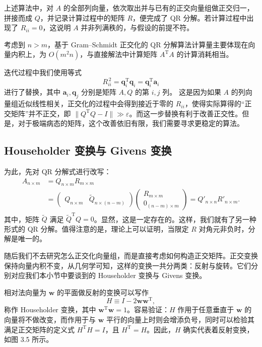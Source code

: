 上述算法中，对 $A$ 的全部列向量，依次取出并与已有的正交向量组做正交归一，拼接而成 $Q$，并记录计算过程中的矩阵 $R$，便完成了 QR 分解。若计算过程中出现了 $R_{ii}=0$，这说明 $A$ 并非列满秩的，与假设的前提不符。

考虑到 $n>m$，基于 Gram--Schmidt 正交化的 QR 分解算法计算量主要体现在向量内积上，为 $O(m^2n)$，与直接解法中计算矩阵 $A^{\mathrm T}A$ 的计算消耗相当。

迭代过程中我们使用等式
\[
R_{ii}^{\,2}=\bm q_i^{\mathrm T}\bm q_i=\bm q_i^{\mathrm T}\bm a_i
\]
进行了替换，其中 $\bm a_i,\bm q_j$ 分别是矩阵 $A,Q$ 的第 $i,j$ 列。
这是因为如果 $A$ 的列向量组近似线性相关，正交化的过程中会得到接近于零的 $R_{ii}$，使得实际算得的“正交矩阵”并不正交，即 $\lVert Q^{\mathrm T}Q-I\rVert\gg\varepsilon$。而这一步替换有利于改善正交性。但是，对于极端病态的矩阵，这个改善依旧有限，我们需要寻求更稳定的算法。

\subsection{Householder 变换与 Givens 变换}

为此，先对 QR 分解式进行改写：
\begin{equation}
\begin{aligned}
A_{n\times m}
&=Q_{n\times m}R_{m\times m}\\
&=\begin{pmatrix}Q_{n\times m}&\widetilde Q_{n\times(n-m)}\end{pmatrix}
\begin{pmatrix}R_{m\times m}\\0_{(n-m)\times m}\end{pmatrix}
=Q'_{n\times n}R'_{n\times m}.
\end{aligned}
\tag{3.3.8}
\end{equation}
其中，矩阵 $\widetilde Q$ 满足 $\widetilde Q^{\mathrm T}Q=0$。显然，这是一定存在的。这样，我们就有了另一种形式的 QR 分解。值得注意的是，理论上可以证明，当限定 $R$ 对角元非负时，分解是唯一的。

随后我们不去研究怎么正交化向量组，而是直接考虑如何构造正交矩阵。正交变换保持向量内积不变，从几何学可知，这样的变换一共分两类：反射与旋转。它们分别对应我们本小节中要谈到的 Householder 变换与 Givens 变换。

相对法向量为 $\bm w$ 的平面做反射的变换可以写作
\begin{equation}
H\equiv I-2\bm w\bm w^{\mathrm T},
\tag{3.3.9}
\end{equation}
称作 Householder 变换，其中 $\bm w^{\mathrm T}\bm w=1$。容易验证：$H$ 作用于任意垂直于 $\bm w$ 的向量将不做改变，而作用于与 $\bm w$ 平行的向量上时则会增添负号，同时可以检验其满足正交矩阵的定义式 $H^{\mathrm T}H=I$，且 $H^{\mathrm T}=H$。因此，$H$ 确实代表着反射变换，如图 3.5 所示。

